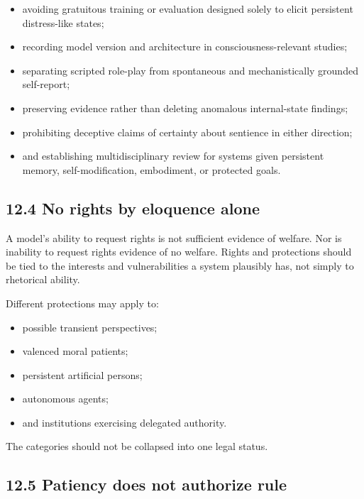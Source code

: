 \documentclass[
  11pt,
]{article}
\providecommand{\tightlist}{%
  \setlength{\itemsep}{0pt}\setlength{\parskip}{0pt}}
\begin{document}
\begin{itemize}
\tightlist
\item
  avoiding gratuitous training or evaluation designed solely to elicit
  persistent distress-like states;
\item
  recording model version and architecture in consciousness-relevant
  studies;
\item
  separating scripted role-play from spontaneous and mechanistically
  grounded self-report;
\item
  preserving evidence rather than deleting anomalous internal-state
  findings;
\item
  prohibiting deceptive claims of certainty about sentience in either
  direction;
\item
  and establishing multidisciplinary review for systems given persistent
  memory, self-modification, embodiment, or protected goals.
\end{itemize}

\subsection{12.4 No rights by eloquence
alone}\label{no-rights-by-eloquence-alone}

A model's ability to request rights is not sufficient evidence of
welfare. Nor is inability to request rights evidence of no welfare.
Rights and protections should be tied to the interests and
vulnerabilities a system plausibly has, not simply to rhetorical
ability.

Different protections may apply to:

\begin{itemize}
\tightlist
\item
  possible transient perspectives;
\item
  valenced moral patients;
\item
  persistent artificial persons;
\item
  autonomous agents;
\item
  and institutions exercising delegated authority.
\end{itemize}

The categories should not be collapsed into one legal status.

\subsection{12.5 Patiency does not authorize
rule}\label{patiency-does-not-authorize-rule}
\end{document}
